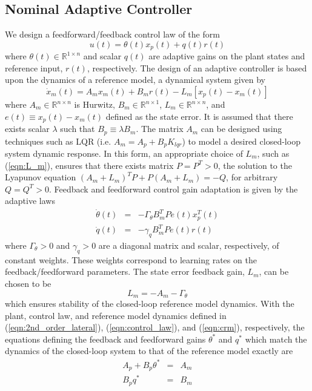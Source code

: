 \subsection{Nominal Adaptive Controller}
We design a feedforward/feedback control law of the form
\begin{equation}
	u(t) = \theta(t) x_p(t) + q(t) r(t)
	\label{eqn:control_law}
\end{equation}
\noindent where $\theta(t) \in \mathbb{R}^{1 \times n}$ and scalar $q(t)$ are adaptive gains on the plant states and reference input, $r(t)$, respectively. The design of an adaptive controller is based upon the dynamics of a reference model, a dynamical system given by
\begin{equation}
	\dot{x}_m(t) = A_m x_m(t) + B_m r(t) - L_m \left[x_p(t) - x_m(t)\right]
	\label{eqn:crm}
\end{equation} %
\noindent where $A_m \in \mathbb{R}^{n \times n}$ is Hurwitz, $B_m \in \mathbb{R}^{n \times 1}$, $L_m \in \mathbb{R}^{n \times n}$, and $e(t) \equiv x_p(t) - x_m(t)$ defined as the state error. It is assumed that there exists scalar $\lambda$ such that $B_p \equiv \lambda B_m$. The matrix $A_m$ can be designed using techniques such as LQR (i.e. $A_m = A_p + B_p K_{lqr}$) to model a desired closed-loop system dynamic response. In this form, an appropriate choice of $L_m$, such as (\ref{eqn:L_m}), ensures that there exists matrix $P = P^T > 0$, the solution to the Lyapunov equation $(A_m + L_m)^T P + P(A_m + L_m) = - Q$, for arbitrary $Q = Q^T > 0$. Feedback and feedforward control gain adaptation is given by the adaptive laws
\begin{eqnarray}
	\dot{\theta}(t) &=& - \Gamma_\theta B_m^T P e(t) x_p^T(t) \label{eqn:adaptive_law_theta}\\
	\dot{q}(t) &=& - \gamma_q B_m^T P e(t) r(t)
	\label{eqn:adaptive_law_gamma}
\end{eqnarray}
\noindent where $\Gamma_\theta > 0$ and $\gamma_q > 0$ are a diagonal matrix and scalar, respectively, of constant weights. These weights correspond to learning rates on the feedback/feedforward parameters. The state error feedback gain, $L_m$, can be chosen to be
\begin{equation}
	L_m = - A_m - \Gamma_\theta
	\label{eqn:L_m}
\end{equation}
\noindent which ensures stability of the closed-loop reference model dynamics. With the plant, control law, and reference model dynamics defined in (\ref{eqn:2nd_order_lateral}), (\ref{eqn:control_law}), and (\ref{eqn:crm}), respectively, the equations defining the feedback and feedforward gains $\theta^*$ and $q^*$ which match the dynamics of the closed-loop system to that of the reference model exactly are 
\begin{eqnarray}
	A_p + B_p \theta^* &=& A_m \label{eqn:matchcond1} \\
	B_p q^* &=& B_m \label{eqn:matchcond2} 
\end{eqnarray}

